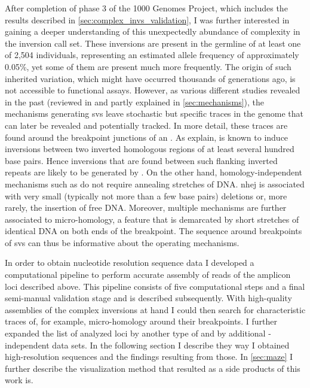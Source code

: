 After completion of phase 3 of the 1000 Genomes Project, which includes the
results described in \cref{sec:complex_invs_validation}, I was further
interested in gaining a deeper understanding of this unexpectedly abundance of
complexity in the inversion call set. These inversions are present in the
germline of at least one of 2,504 individuals, representing an estimated allele
frequency of approximately 0.05\%, yet some of them are present much more
frequently. The origin of such inherited variation, which might have occurred
thousands of generations ago, is not accessible to functional assays. However,
as various different studies revealed in the past (reviewed in
\citet{Onishi-Seebacher2011,Hastings2009} and partly explained in
\cref{sec:mechanisms}), the mechanisms generating \acp{sv} leave stochastic but
specific traces in the genome that can later be revealed and potentially
tracked. In more detail, these traces are found around the breakpoint junctions
of an \sv. As \citet{Hastings2009} explain, \nahr is known to induce inversions
between two inverted homologous regions of at least several hundred base pairs.
Hence inversions that are found between such flanking inverted repeats are
likely to be generated by \nahr. On the other hand, homology-independent
mechanisms such as \nhej do not require annealing stretches of DNA. \acs{nhej}
is associated with very small (typically not more than a few base pairs)
deletions or, more rarely, the insertion of free DNA. Moreover, multiple
mechanisms are further associated to micro-homology, a feature that is
demarcated by short stretches of identical DNA on both ends of the breakpoint.
The sequence around breakpoints of \acp{sv} can thus be informative about the
operating mechanisms.

In order to obtain nucleotide resolution sequence data I developed a
computational pipeline to perform accurate assembly of \pacbio reads of the
amplicon loci described above. This pipeline consists of five computational
steps and a final semi-manual validation stage and is described subsequently.
With high-quality assemblies of the complex inversions at hand I could then
search for characteristic traces of, for example, micro-homology around their
breakpoints. I further expanded the list of analyzed loci by another type of \sv
and by additional \pacbio-independent data sets. In the following section I
describe they way I obtained high-resolution sequences and the findings
resulting from those. In \cref{sec:maze} I further describe the visualization
method that resulted as a side products of this work is.




